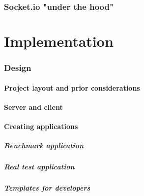\documentclass[12pt]{article}
\begin{document}
\section{Socket.io "under the hood"}

\pagebreak
\part{Implementation}
\pagebreak
\section{Design}
\subsection{Project layout and prior considerations}
\subsection{Server and client}
\subsection{Creating applications}
\subsubsection{Benchmark application}
\subsubsection{Real test application}
\subsubsection{Templates for developers}

\end{document}
